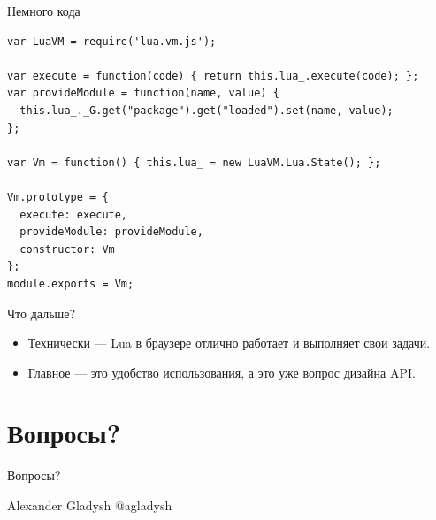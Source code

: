 \documentclass[aspectratio=169,handout,bigger]{beamer}
\begin{document}
\begin{frame}[fragile]{Немного кода}

\begin{verbatim}
var LuaVM = require('lua.vm.js');

var execute = function(code) { return this.lua_.execute(code); };
var provideModule = function(name, value) {
  this.lua_._G.get("package").get("loaded").set(name, value);
};

var Vm = function() { this.lua_ = new LuaVM.Lua.State(); };

Vm.prototype = {
  execute: execute,
  provideModule: provideModule,
  constructor: Vm
};
module.exports = Vm;
\end{verbatim}

\end{frame}


\begin{frame}{Что дальше?}

\begin{itemize}
\item Технически — Lua в браузере отлично работает и выполняет свои задачи.
\item Главное — это удобство использования, а это уже вопрос дизайна API.
\end{itemize}

\end{frame}


\section{Вопросы?}


\begin{frame}{Вопросы?}

Alexander Gladysh\newline
@agladysh

\end{frame}

\end{document}
